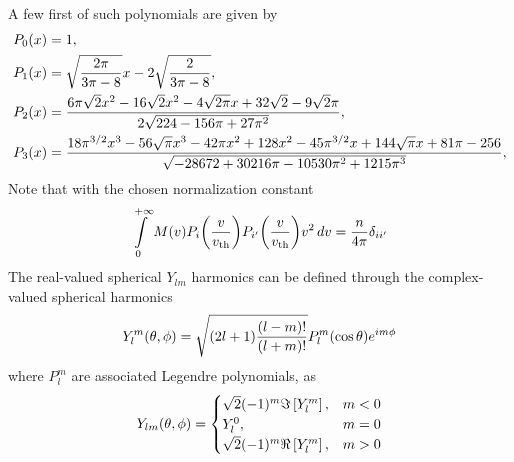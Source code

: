 \documentclass[10pt,letterpaper]{article}
\newcommand{\myint}[2]{\int\limits_{#1}^{#2}}
\newcommand{\diff}[1]{\, d#1}
\newcommand{\of}[1]{\mleft( #1 \mright)}
\newcommand{\vth}{v_\textrm{th}}
\begin{document}
A few first of such polynomials are given by
\begin{align*}
P_0\of{x} & = 1,
\\
P_1\of{x} & = \sqrt{\frac{2 \pi }{3 \pi -8}} x-2 \sqrt{\frac{2}{3 \pi -8}},
\\
P_2\of{x} & = \frac{6 \pi  \sqrt{2} x^2-16 \sqrt{2} x^2-4 \sqrt{2 \pi } x+32 \sqrt{2}-9 \sqrt{2} \pi }{2 \sqrt{224-156 \pi +27 \pi ^2}},
\\
P_3\of{x} & = \frac{18 \pi ^{3/2} x^3-56 \sqrt{\pi } x^3-42 \pi  x^2+128 x^2-45 \pi ^{3/2} x+144 \sqrt{\pi } x+81 \pi -256}{\sqrt{-28672+30216 \pi -10530 \pi ^2+1215 \pi ^3}},
\end{align*}
Note that with the chosen normalization constant
\begin{align*}
\myint{0}{+\infty} M\of{v} P_i\of{\frac{v}{\vth}} P_{i^\prime}\of{\frac{v}{\vth}} v^2 \diff{v} = \frac{n}{4 \pi}\delta_{ii^\prime}
\end{align*}
The real-valued spherical $Y_{lm}$ harmonics can be defined through the complex-valued spherical harmonics
\begin{align*}
Y_{l}^{m} \of{\theta, \phi} 
= \sqrt{(2l+1) \frac{(l-m)!}{(l+m)!} }
P_l^m\of{\cos\theta} e^{im\phi}
\end{align*}
where $P_l^m$ are associated Legendre polynomials, as
\begin{align*}
Y_{lm} \of{\theta, \phi} 
=
\begin{cases}
\sqrt{2} (-1)^m \Im\left[Y_{l}^{m}\right], & m < 0 \\
Y_{l}^{0}, & m = 0 \\
\sqrt{2} (-1)^m \Re\left[Y_{l}^{m}\right], & m > 0
\end{cases}
\end{align*}
\end{document}

